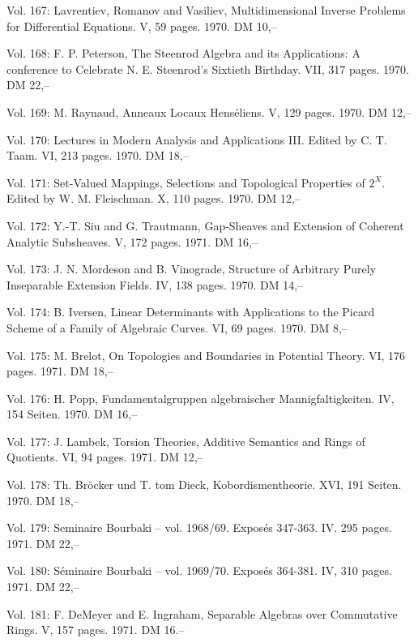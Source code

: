 Vol. 167: Lavrentiev, Romanov and Vasiliev, Multidimensional Inverse Problems for Differential Equations. V, 59 pages. 1970. DM 10,--

Vol. 168: F. P. Peterson, The Steenrod Algebra and its Applications: A conference to Celebrate N. E. Steenrod's Sixtieth Birthday. VII, 317 pages. 1970. DM 22,--

Vol. 169: M. Raynaud, Anneaux Locaux Henséliens. V, 129 pages. 1970. DM 12,--

Vol. 170: Lectures in Modern Analysis and Applications III. Edited by C. T. Taam. VI, 213 pages. 1970. DM 18,--

Vol. 171: Set-Valued Mappings, Selections and Topological Properties of \(2^X\). Edited by W. M. Fleischman. X, 110 pages. 1970. DM 12,--

Vol. 172: Y.-T. Siu and G. Trautmann, Gap-Sheaves and Extension of Coherent Analytic Subsheaves. V, 172 pages. 1971. DM 16,--

Vol. 173: J. N. Mordeson and B. Vinograde, Structure of Arbitrary Purely Inseparable Extension Fields. IV, 138 pages. 1970. DM 14,--

Vol. 174: B. Iversen, Linear Determinants with Applications to the Picard Scheme of a Family of Algebraic Curves. VI, 69 pages. 1970. DM 8,--

Vol. 175: M. Brelot, On Topologies and Boundaries in Potential Theory. VI, 176 pages. 1971. DM 18,--

Vol. 176: H. Popp, Fundamentalgruppen algebraischer Mannigfaltigkeiten. IV, 154 Seiten. 1970. DM 16,--

Vol. 177: J. Lambek, Torsion Theories, Additive Semantics and Rings of Quotients. VI, 94 pages. 1971. DM 12,--

Vol. 178: Th. Bröcker und T. tom Dieck, Kobordismentheorie. XVI, 191 Seiten. 1970. DM 18,--

Vol. 179: Seminaire Bourbaki -- vol. 1968/69. Exposés 347-363. IV. 295 pages. 1971. DM 22,--

Vol. 180: Séminaire Bourbaki -- vol. 1969/70. Exposés 364-381. IV, 310 pages. 1971. DM 22,--

Vol. 181: F. DeMeyer and E. Ingraham, Separable Algebras over Commutative Rings. V, 157 pages. 1971. DM 16.--

